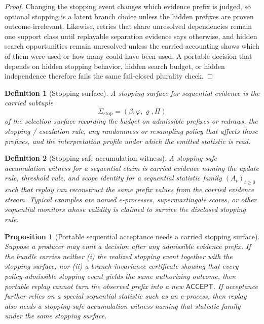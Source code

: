 \documentclass[11pt]{article}
\newtheorem{definition}{Definition}
\newtheorem{proposition}{Proposition}
\theoremstyle{remark}
\newcommand{\Acc}{\mathsf{ACCEPT}}
\begin{document}
\begin{proof}
Changing the stopping event changes which evidence prefix is judged, so optional stopping is a latent branch choice unless the hidden prefixes are proven outcome-irrelevant.
Likewise, retries that share unresolved dependencies remain one support class until replayable separation evidence says otherwise,
and hidden search opportunities remain unresolved unless the carried accounting shows which of them were used or how many could have been used.
A portable decision that depends on hidden stopping behavior, hidden search budget, or hidden independence therefore fails the same fail-closed plurality check.
\end{proof}

\begin{definition}[Stopping surface]
A stopping surface for sequential evidence is the carried subtuple
\[
\Sigma_{\mathrm{stop}}=(\beta,\varphi,\varrho,\Pi)
\]
of the selection surface recording the budget on admissible prefixes or redraws, the stopping / escalation rule, any randomness or resampling policy that affects those prefixes, and the interpretation profile under which the emitted statistic is read.
\end{definition}

\begin{definition}[Stopping-safe accumulation witness]
A stopping-safe accumulation witness for a sequential claim is carried evidence naming the update rule, threshold rule, and scope identity for a sequential statistic family $(A_t)_{t\ge 0}$ such that replay can reconstruct the same prefix values from the carried evidence stream.
Typical examples are named e-processes, supermartingale scores, or other sequential monitors whose validity is claimed to survive the disclosed stopping rule.
\end{definition}

\begin{proposition}[Portable sequential acceptance needs a carried stopping surface]
Suppose a producer may emit a decision after any admissible evidence prefix.
If the bundle carries neither
(i) the realized stopping event together with the stopping surface, nor
(ii) a branch-invariance certificate showing that every policy-admissible stopping event yields the same authorizing outcome,
then portable replay cannot turn the observed prefix into a new $\Acc$.
If acceptance further relies on a special sequential statistic such as an e-process,
then replay also needs a stopping-safe accumulation witness naming that statistic family under the same stopping surface.
\end{proposition}
\end{document}
